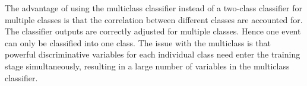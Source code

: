 The advantage of using the multiclass classifier instead of a two-class classifier for multiple classes is that the correlation between different classes are accounted for. The classifier outputs are correctly adjusted for multiple classes. Hence one event can only be classified into one class. The issue with the multiclass is that powerful discriminative variables for each individual class need enter the training stage simultaneously, resulting in a large number of variables in the  multiclass classifier.


